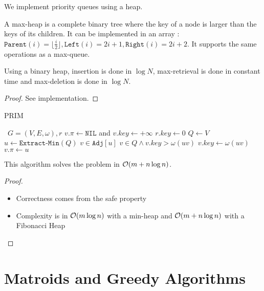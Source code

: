 \documentclass[12pt]{cours}
\begin{document}
We implement priority queues using a heap.
\begin{definition}
    A max-heap is a complete binary tree where the key of a node is larger than the keys of its children. It can be implemented in an array : $\texttt{Parent}(i) = \lfloor \frac{i}{2}\rfloor, \texttt{Left}(i) = 2 i + 1, \texttt{Right}(i) = 2i + 2$. It supports the same operations as a max-queue.
\end{definition}

\begin{theorem}
    Using a binary heap, insertion is done in $\log N$, max-retrieval is done in constant time and max-deletion is done in $\log N$.
\end{theorem}
\begin{proof}
    See implementation.
\end{proof}

\begin{algorithm}
    \caption{PRIM}
    \begin{algorithmic}
        \Input \ $G = \left(V, E, \omega\right), r$
        \EndInput
        \State $v.\pi \gets \texttt{NIL}$ and $v.key \gets + \infty$
        \EndFor
        \State $r.key \gets 0$
        \State $Q \gets V$
        \State $u \gets \texttt{Extract-Min}(Q)$
        \For $v \in \texttt{Adj}[u]$
        \If $v \in Q \wedge v.key > \omega(uv)$
        \State $v.key \gets \omega(uv)$
        \State $v.\pi \gets u$
        \EndIf
        \EndFor
        \EndWhile
    \end{algorithmic}
\end{algorithm}

\begin{theorem}
    This algorithm solves the problem in $\mathcal{O}(m + n\log n)$.
\end{theorem}

\begin{proof}
    \begin{itemize}
        \item Correctness comes from the safe property
        \item Complexity is in $\mathcal{O}(m\log n)$ with a min-heap and $\mathcal{O}(m + n\log n)$ with a Fibonacci Heap
    \end{itemize}
\end{proof}

\section{Matroids and Greedy Algorithms}
\end{document}
